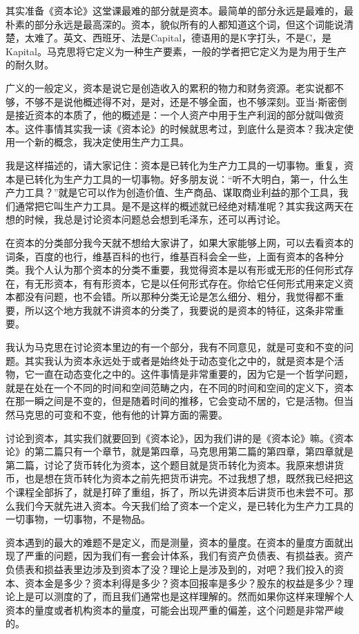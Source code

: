 \documentclass[UTF8, 12pt, a4paper]{ctexrep}
\begin{document}
其实准备《资本论》这堂课最难的部分就是资本。最简单的部分永远是最难的，最朴素的部分永远是最高深的。资本，貌似所有的人都知道这个词，但这个词能说清楚，太难了。英文、西班牙、法是Capital，德语用的是K字打头，不是C，是Kapital。马克思将它定义为一种生产要素，一般的学者把它定义为是为用于生产的耐久财。

广义的一般定义，资本是说它是创造收入的累积的物力和财务资源。老实说都不够，不够不是说他概述得不对，是对，还是不够全面，也不够深刻。亚当⋅斯密倒是接近资本的本质了，他的概述是：一个人资产中用于生产利润的部分就叫做资本。这件事情其实我一读《资本论》的时候就思考过，到底什么是资本？我决定使用一个新的概念，我决定使用生产力工具。

我是这样描述的，请大家记住：资本是已转化为生产力工具的一切事物。重复，资本是已转化为生产力工具的一切事物。好多朋友说：“听不大明白，第一，什么生产力工具？”就是它可以作为创造价值、生产商品、谋取商业利益的那个工具，我们通常把它叫生产力工具。是不是这样的概述就已经绝对精准呢？其实我这两天在想的时候，我总是讨论资本问题总会想到毛泽东，还可以再讨论。

在资本的分类部分我今天就不想给大家讲了，如果大家能够上网，可以去看资本的词条，百度的也行，维基百科的也行，维基百科会全一些，上面有资本的各种分类。我个人认为那个资本的分类不重要，我觉得资本是以有形或无形的任何形式存在，有无形资本，有有形资本，它是以任何形式存在。你给它任何形式用来定义资本都没有问题，也不会错。所以那种分类无论是怎么细分、粗分，我觉得都不重要，所以这个地方我就不讲资本的分类了，我要说的是资本的特征，这条非常重要。

我认为马克思在讨论资本里边的有一个部分，我有不同意见，就是可变和不变的问题。其实我认为资本永远处于或者是始终处于动态变化之中的，就是资本是个活物，它一直在动态变化之中的。这件事情是非常重要的，因为它是一个哲学问题，就是在处在一个不同的时间和空间范畴之内，在不同的时间和空间的定义下，资本在那一瞬之间是不变的，但是随着时间的推移，它会变动不居的，它是活物。但当然马克思的可变和不变，他有他的计算方面的需要。

讨论到资本，其实我们就要回到《资本论》，因为我们讲的是《资本论》嘛。《资本论》的第二篇只有一个章节，就是第四章，马克思用第二篇的第四章，第四章就是第二篇，讨论了货币转化为资本，这个题目就是货币转化为资本。我原来想讲货币，也是想在货币转化为资本之前先把货币讲完。不过我想了想，既然我已经把这个课程全部拆了，就是打碎了重组，拆了，所以先讲资本后讲货币也未尝不可。那么我们今天就先进入资本。今天我们给了资本一个定义，是已转化为生产力工具的一切事物，一切事物，不是物品。

资本遇到的最大的难题不是定义，而是测量，资本的量度。在资本的量度方面就出现了严重的问题，因为我们有一套会计体系，我们有资产负债表、有损益表。资产负债表和损益表里边涉及到资本了没？理论上是涉及到的，对吧？我们投入的资本、资本金是多少？资本利得是多少？资本回报率是多少？股东的权益是多少？理论上是可以测度的了，而且我们通常也是这样理解的。然而如果你这样来理解个人资本的量度或者机构资本的量度，可能会出现严重的偏差，这个问题是非常严峻的。
\end{document}
